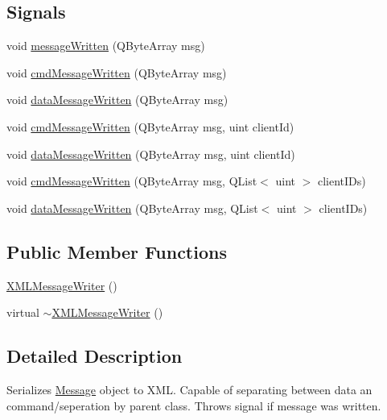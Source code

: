 \subsection*{Signals}
\begin{DoxyCompactItemize}
\item 
void \hyperlink{class_x_m_l_message_writer_a5933cecd527130818516cb075115acce}{message\+Written} (Q\+Byte\+Array msg)
\item 
void \hyperlink{class_x_m_l_message_writer_a9455136cd0c658e166fbbd0d47153568}{cmd\+Message\+Written} (Q\+Byte\+Array msg)
\item 
void \hyperlink{class_x_m_l_message_writer_a80e0298500422bda2e531b9054d3c2de}{data\+Message\+Written} (Q\+Byte\+Array msg)
\item 
void \hyperlink{class_x_m_l_message_writer_a8d80c318d90c538b1fe66781245b90ad}{cmd\+Message\+Written} (Q\+Byte\+Array msg, uint client\+Id)
\item 
void \hyperlink{class_x_m_l_message_writer_a49aa21f32d0fb886a8094be1006a7720}{data\+Message\+Written} (Q\+Byte\+Array msg, uint client\+Id)
\item 
void \hyperlink{class_x_m_l_message_writer_a530545ff124e44a0b4b0c8f465c880af}{cmd\+Message\+Written} (Q\+Byte\+Array msg, Q\+List$<$ uint $>$ client\+I\+Ds)
\item 
void \hyperlink{class_x_m_l_message_writer_ae26e634032594dca802e1aa8fb191465}{data\+Message\+Written} (Q\+Byte\+Array msg, Q\+List$<$ uint $>$ client\+I\+Ds)
\end{DoxyCompactItemize}
\subsection*{Public Member Functions}
\begin{DoxyCompactItemize}
\item 
\hyperlink{class_x_m_l_message_writer_a7feece46742c84f95efe202c217e2111}{X\+M\+L\+Message\+Writer} ()
\item 
virtual \hyperlink{class_x_m_l_message_writer_a864cd0a985276a6d8e229420b17b175b}{$\sim$\+X\+M\+L\+Message\+Writer} ()
\end{DoxyCompactItemize}


\subsection{Detailed Description}
Serializes \hyperlink{class_message}{Message} object to X\+M\+L. Capable of separating between data an command/seperation by parent class. Throws signal if message was written. 

